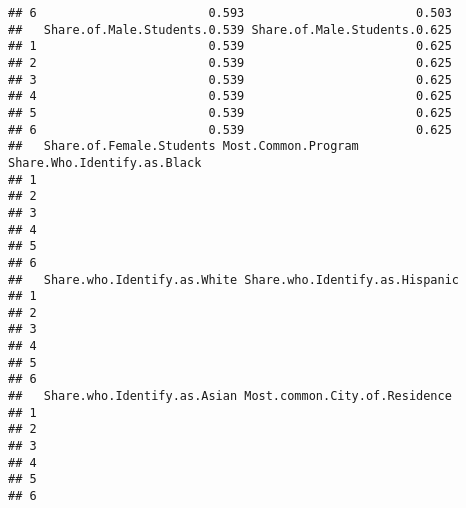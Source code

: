 \documentclass[]{article}
\begin{document}
\begin{verbatim}
## 6                        0.593                        0.503
##   Share.of.Male.Students.0.539 Share.of.Male.Students.0.625
## 1                        0.539                        0.625
## 2                        0.539                        0.625
## 3                        0.539                        0.625
## 4                        0.539                        0.625
## 5                        0.539                        0.625
## 6                        0.539                        0.625
##   Share.of.Female.Students Most.Common.Program Share.Who.Identify.as.Black
## 1                                                                         
## 2                                                                         
## 3                                                                         
## 4                                                                         
## 5                                                                         
## 6                                                                         
##   Share.who.Identify.as.White Share.who.Identify.as.Hispanic
## 1                                                           
## 2                                                           
## 3                                                           
## 4                                                           
## 5                                                           
## 6                                                           
##   Share.who.Identify.as.Asian Most.common.City.of.Residence
## 1                                                          
## 2                                                          
## 3                                                          
## 4                                                          
## 5                                                          
## 6
\end{verbatim}
\end{document}
